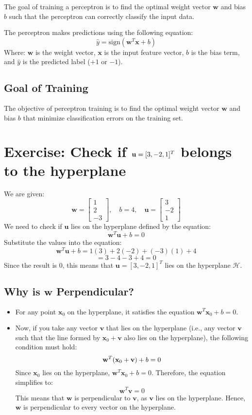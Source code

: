The goal of training a perceptron is to find the optimal weight vector \( \mathbf{w} \) and bias \( b \) such that the perceptron can correctly classify the input data.

The perceptron makes predictions using the following equation:
\[
\hat{y} = \text{sign}(\mathbf{w}^T \mathbf{x} + b)
\]
Where:
 \( \mathbf{w} \) is the weight vector,
 \( \mathbf{x} \) is the input feature vector,
 \( b \) is the bias term, and
 \( \hat{y} \) is the predicted label ($+1$ or $-1$).

\subsection{Goal of Training}
The objective of perceptron training is to find the optimal weight vector \( \mathbf{w} \) and bias \( b \) that minimize classification errors on the training set. 

\section{Exercise: Check if \( {\bf u} = [3, -2, 1]^T \) belongs to the hyperplane}

We are given:
\[
\mathbf{w} = \begin{bmatrix} 1 \\ 2 \\ -3 \end{bmatrix}, \quad b = 4, \quad \mathbf{u} = \begin{bmatrix} 3 \\ -2 \\ 1 \end{bmatrix}
\]
We need to check if \( \mathbf{u} \) lies on the hyperplane defined by the equation:
\[
\mathbf{w}^T \mathbf{u} + b = 0
\]
Substitute the values into the equation:
\[
\mathbf{w}^T \mathbf{u} + b = 1(3) + 2(-2) + (-3)(1) + 4
\]
\[
= 3 - 4 - 3 + 4 = 0
\]
Since the result is \( 0 \), this means that \( \mathbf{u} = [3, -2, 1]^T \) lies on the hyperplane \( \mathcal{H} \).


\subsection{Why is \( \mathbf{w} \) Perpendicular?}
\begin{itemize}
    \item For any point \( \mathbf{x}_0 \) on the hyperplane, it satisfies the equation \( \mathbf{w}^T \mathbf{x}_0 + b = 0 \).
    \item Now, if you take any vector \( \mathbf{v} \) that lies on the hyperplane (i.e., any vector \( \mathbf{v} \) such that the line formed by \( \mathbf{x}_0 + \mathbf{v} \) also lies on the hyperplane), the following condition must hold:
    \[
    {\bf w}^T ({\bf x}_0 + {\bf v}) + b = 0
    \]
    Since \( \mathbf{x}_0 \) lies on the hyperplane, \( \mathbf{w}^T \mathbf{x}_0 + b = 0 \). Therefore, the equation simplifies to:
    \[
    \mathbf{w}^T \mathbf{v} = 0
    \]
    This means that \( \mathbf{w} \) is perpendicular to \( \mathbf{v} \), as \( \mathbf{v} \) lies on the hyperplane. Hence, \( \mathbf{w} \) is perpendicular to every vector on the hyperplane.
\end{itemize}

